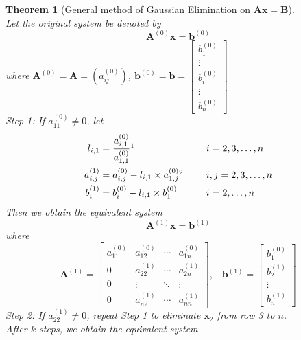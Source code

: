 \documentclass[12pt]{article}
\newtheorem{theorem}{Theorem}[section]
\theoremstyle{definition}
\begin{document}
\begin{theorem}[General method of Gaussian Elimination on $\mathbf{A}\mathbf{x}=\mathbf{B}$]
\hfill\\\normalfont Let the original system be denoted by 
\[
\mathbf{A}^{(0)}\mathbf{x}=\mathbf{b}^{(0)}
\]
where $\mathbf{A}^{(0)} = \mathbf{A} = (a_{ij}^{(0)})$, $\mathbf{b}^{(0)}=\mathbf{b} = \begin{bmatrix}
b_1^{(0)}\\
\vdots\\
b_i^{(0)}\\
\vdots\\
b_n^{(0)}
\end{bmatrix}$\\
Step 1: If $a_{11}^{(0)}\neq 0$, let
\begin{alignat*}{23}
l_{i,1}&=\frac{a^{(0)}_{i,1}}{a^{(0)}_{1,1}}\footnotemark&&\;\;\;\;\;i = 2,3,\ldots, n\\
a^{(1)}_{i,j}&=a^{(0)}_{i,j}-l_{i,1}\times a^{(0)}_{1,j}\footnotemark&&\;\;\;\;\;i,j = 2,3,\ldots,n\\
b^{(1)}_{i}&=b^{(0)}_i-l_{i,1}\times b^{(0)}_1&&\;\;\;\;\;i = 2,\ldots,n
\end{alignat*}
Then we obtain the equivalent system
\[
\mathbf{A}^{(1)}\mathbf{x}=\mathbf{b}^{(1)}
\]
where
\[
\mathbf{A}^{(1)}=\begin{bmatrix}
a_{11}^{(0)}&a_{12}^{(0)}&\cdots&a_{1n}^{(0)}\\
0&a_{22}^{(1)}&\cdots&a_{2n}^{(1)}\\
0&\vdots&\ddots&\vdots\\
0&a_{n2}^{(1)}&\cdots&a_{nn}^{(1)}\end{bmatrix},\;\;\; \mathbf{b}^{(1)} = \begin{bmatrix}
b_1^{(0)}\\
b_2^{(1)}\\
\vdots\\
b_n^{(1)}
\end{bmatrix}
\]
Step 2: If $a_{22}^{(1)}\neq 0$, repeat Step 1 to eliminate $\mathbf{x}_2$ from row 3 to $n$.\\After $k$ steps, we obtain the equivalent system

\end{theorem}
\end{document}
